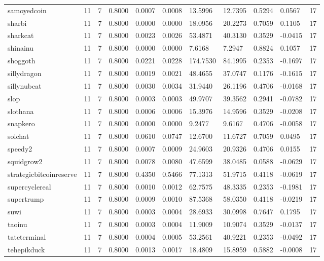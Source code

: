 \begin{table}[htbp]
\begin{tabular}{lllllllllll}
samoyedcoin & 11 & 7 & 0.8000 & 0.0007 & 0.0008 & 13.5996 & 12.7395 & 0.5294 & 0.0567 & 17 \\
sharbi & 11 & 7 & 0.8000 & 0.0000 & 0.0000 & 18.0956 & 20.2273 & 0.7059 & 0.1105 & 17 \\
sharkcat & 11 & 7 & 0.8000 & 0.0023 & 0.0026 & 53.4871 & 40.3130 & 0.3529 & -0.0415 & 17 \\
shinainu & 11 & 7 & 0.8000 & 0.0000 & 0.0000 & 7.6168 & 7.2947 & 0.8824 & 0.1057 & 17 \\
shoggoth & 11 & 7 & 0.8000 & 0.0221 & 0.0228 & 174.7530 & 84.1995 & 0.2353 & -0.1697 & 17 \\
sillydragon & 11 & 7 & 0.8000 & 0.0019 & 0.0021 & 48.4655 & 37.0747 & 0.1176 & -0.1615 & 17 \\
sillynubcat & 11 & 7 & 0.8000 & 0.0030 & 0.0034 & 31.9440 & 26.1196 & 0.4706 & -0.0168 & 17 \\
slop & 11 & 7 & 0.8000 & 0.0003 & 0.0003 & 49.9707 & 39.3562 & 0.2941 & -0.0782 & 17 \\
slothana & 11 & 7 & 0.8000 & 0.0006 & 0.0006 & 15.3976 & 14.9596 & 0.3529 & -0.0208 & 17 \\
snapkero & 11 & 7 & 0.8000 & 0.0000 & 0.0000 & 9.2477 & 9.6167 & 0.4706 & -0.0058 & 17 \\
solchat & 11 & 7 & 0.8000 & 0.0610 & 0.0747 & 12.6700 & 11.6727 & 0.7059 & 0.0495 & 17 \\
speedy2 & 11 & 7 & 0.8000 & 0.0007 & 0.0009 & 24.9603 & 20.9326 & 0.4706 & 0.0155 & 17 \\
squidgrow2 & 11 & 7 & 0.8000 & 0.0078 & 0.0080 & 47.6599 & 38.0485 & 0.0588 & -0.0629 & 17 \\
strategicbitcoinreserve & 11 & 7 & 0.8000 & 0.4350 & 0.5466 & 77.1313 & 51.9715 & 0.4118 & -0.0619 & 17 \\
supercyclereal & 11 & 7 & 0.8000 & 0.0010 & 0.0012 & 62.7575 & 48.3335 & 0.2353 & -0.1981 & 17 \\
supertrump & 11 & 7 & 0.8000 & 0.0009 & 0.0010 & 87.5368 & 58.0350 & 0.4118 & -0.0219 & 17 \\
suwi & 11 & 7 & 0.8000 & 0.0003 & 0.0004 & 28.6933 & 30.0998 & 0.7647 & 0.1795 & 17 \\
taoinu & 11 & 7 & 0.8000 & 0.0003 & 0.0004 & 11.9009 & 10.9074 & 0.3529 & -0.0137 & 17 \\
tateterminal & 11 & 7 & 0.8000 & 0.0004 & 0.0005 & 53.2561 & 40.9221 & 0.2353 & -0.0492 & 17 \\
tehepikduck & 11 & 7 & 0.8000 & 0.0013 & 0.0017 & 18.4809 & 15.8959 & 0.5882 & -0.0008 & 17 \\

\end{tabular}
\end{table}
